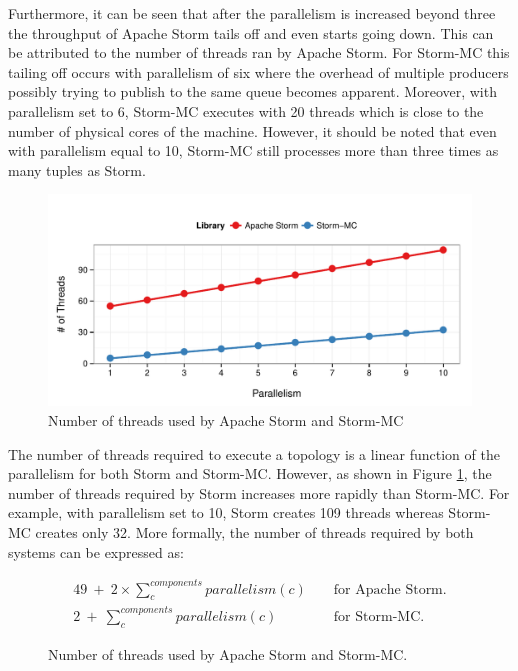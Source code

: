 \documentclass[bsc,twoside,singlespacing,normalheadings,parskip]{infthesis}\usepackage[]{graphicx}\usepackage[]{color}
\makeatletter
\def\maxwidth{ %
  \ifdim\Gin@nat@width>\linewidth
    \linewidth
  \else
    \Gin@nat@width
  \fi
}
\newenvironment{knitrout}{}{} %
\makeatother
\begin{document}
Furthermore, it can be seen that after the parallelism is increased beyond three the throughput of Apache Storm tails off and even starts going down. This can be attributed to the number of threads ran by Apache Storm. For Storm-MC this tailing off occurs with parallelism of six where the overhead of multiple producers possibly trying to publish to the same queue becomes apparent. Moreover, with parallelism set to 6, Storm-MC executes with 20 threads which is close to the number of physical cores of the machine. However, it should be noted that even with parallelism equal to 10, Storm-MC still processes more than three times as many tuples as Storm.

\begin{knitrout}
\color{fgcolor}\begin{figure}[!htb]

{\centering \includegraphics[width=\maxwidth]{figure/threads-plot-1} 

}

\caption[Number of threads used by Apache Storm and Storm-MC]{Number of threads used by Apache Storm and Storm-MC}\label{fig:threads-plot}
\end{figure}


\end{knitrout}

The number of threads required to execute a topology is a linear function of the parallelism for both Storm and Storm-MC. However, as shown in Figure \ref{fig:threads-plot}, the number of threads required by Storm increases more rapidly than Storm-MC. For example, with parallelism set to 10, Storm creates 109 threads whereas Storm-MC creates only 32. More formally, the number of threads required by both systems can be expressed as:

\begin{figure}[!htb]
\begin{eqnarray*}
	49 \ + \ 2 \times \sum\limits_{c}^{components} parallelism(c) && \text{ for Apache Storm.} \\
	2 \ + \ \sum\limits_{c}^{components} parallelism(c) && \text{ for Storm-MC.}
\end{eqnarray*}
\caption{Number of threads used by Apache Storm and Storm-MC.}
\end{figure}
\end{document}
